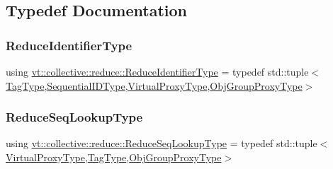 \subsection{Typedef Documentation}
\mbox{\label{namespacevt_1_1collective_1_1reduce_ad688d164ad18b2011198cbc97cc84b74}} 
\subsubsection{\texorpdfstring{Reduce\+Identifier\+Type}{ReduceIdentifierType}}
{\footnotesize\ttfamily using \hyperlink{namespacevt_1_1collective_1_1reduce_ad688d164ad18b2011198cbc97cc84b74}{vt\+::collective\+::reduce\+::\+Reduce\+Identifier\+Type} = typedef std\+::tuple$<$\hyperlink{namespacevt_a84ab281dae04a52a4b243d6bf62d0e52}{Tag\+Type},\hyperlink{namespacevt_a3063d4db3b879d6dd2c7b8d50995c7f6}{Sequential\+I\+D\+Type},\hyperlink{namespacevt_a1b417dd5d684f045bb58a0ede70045ac}{Virtual\+Proxy\+Type},\hyperlink{namespacevt_ad7cae989df485fccca57f0792a880a8e}{Obj\+Group\+Proxy\+Type}$>$}

\mbox{\label{namespacevt_1_1collective_1_1reduce_a3e69dddbbc89a0c9e9b986c5642efeba}} 
\subsubsection{\texorpdfstring{Reduce\+Seq\+Lookup\+Type}{ReduceSeqLookupType}}
{\footnotesize\ttfamily using \hyperlink{namespacevt_1_1collective_1_1reduce_a3e69dddbbc89a0c9e9b986c5642efeba}{vt\+::collective\+::reduce\+::\+Reduce\+Seq\+Lookup\+Type} = typedef std\+::tuple$<$\hyperlink{namespacevt_a1b417dd5d684f045bb58a0ede70045ac}{Virtual\+Proxy\+Type},\hyperlink{namespacevt_a84ab281dae04a52a4b243d6bf62d0e52}{Tag\+Type},\hyperlink{namespacevt_ad7cae989df485fccca57f0792a880a8e}{Obj\+Group\+Proxy\+Type}$>$}

